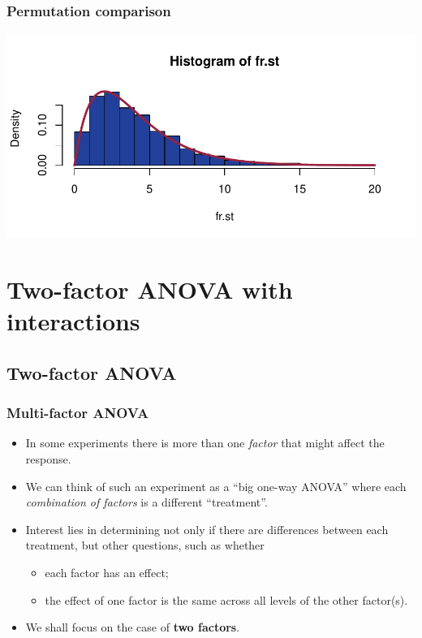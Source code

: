 \documentclass[a4paper]{article}
\begin{document}
\subsubsection{Permutation comparison}
\begin{Schunk}


{\centering \includegraphics[width=\maxwidth]{figure/listings-unnamed-chunk-301-1} 

}

\end{Schunk}
\newpage

\section{Two-factor ANOVA with interactions}\label{sec:25}
\subsection{Two-factor ANOVA}
\subsubsection{Multi-factor ANOVA}
\begin{itemize}
	\item In some experiments there is more than one \textit{factor} that might affect the response.
	\item We can think of such an experiment as a ``big one-way ANOVA'' where each \textit{combination of factors} is a different ``treatment''.
	\item Interest lies in determining not only if there are differences between each treatment, but other questions, such as whether
	\begin{itemize}
		\item each factor has an effect;
		\item the effect of one factor is the same across all levels of the other factor(s).
	\end{itemize}
	\item We shall focus on the case of \textbf{two factors}.
\end{itemize}
\end{document}
